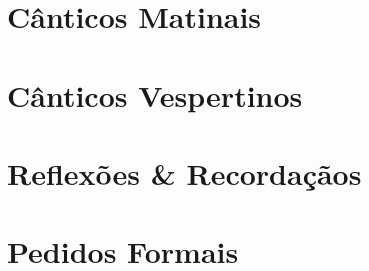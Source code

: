 
\morningPartSettings

\part{Cânticos Matinais}

\morningChapterSettings



\morningSettingsRestore

\eveningPartSettings

\part{Cânticos Vespertinos}

\eveningChapterSettings



\eveningSettingsRestore


\part{Reflexões \& Recordaçãos}





\requestsPartSettings


\part{Pedidos Formais}

\requestsChapterSettings



\requestsSettingsRestore

